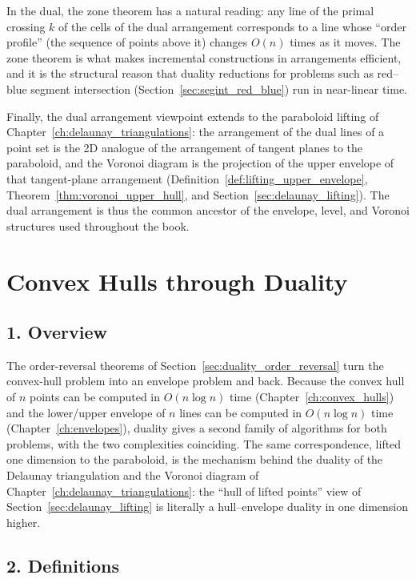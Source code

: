 In the dual, the zone theorem has a natural reading: any line of the primal
crossing $k$ of the cells of the dual arrangement corresponds to a line
whose ``order profile'' (the sequence of points above it) changes $O(n)$
times as it moves. The zone theorem is what makes incremental constructions
in arrangements efficient, and it is the structural reason that duality
reductions for problems such as red--blue segment intersection
(Section~\ref{sec:segint_red_blue}) run in near-linear time.

Finally, the dual arrangement viewpoint extends to the paraboloid lifting of
Chapter~\ref{ch:delaunay_triangulations}: the arrangement of the dual lines
of a point set is the 2D analogue of the arrangement of tangent planes to
the paraboloid, and the Voronoi diagram is the projection of the upper
envelope of that tangent-plane arrangement
(Definition~\ref{def:lifting_upper_envelope},
Theorem~\ref{thm:voronoi_upper_hull}, and
Section~\ref{sec:delaunay_lifting}). The dual arrangement is thus the
common ancestor of the envelope, level, and Voronoi structures used
throughout the book.


\section{Convex Hulls through Duality}
\label{sec:duality_convex_hulls}

\subsection{1. Overview}

The order-reversal theorems of Section~\ref{sec:duality_order_reversal}
turn the convex-hull problem into an envelope problem and back. Because the
convex hull of $n$ points can be computed in $O(n \log n)$ time
(Chapter~\ref{ch:convex_hulls}) and the lower/upper envelope of $n$ lines
can be computed in $O(n \log n)$ time (Chapter~\ref{ch:envelopes}), duality
gives a second family of algorithms for both problems, with the two
complexities coinciding. The same correspondence, lifted one dimension to
the paraboloid, is the mechanism behind the duality of the Delaunay
triangulation and the Voronoi diagram of
Chapter~\ref{ch:delaunay_triangulations}: the ``hull of lifted points'' view
of Section~\ref{sec:delaunay_lifting} is literally a hull--envelope duality
in one dimension higher.

\subsection{2. Definitions}

